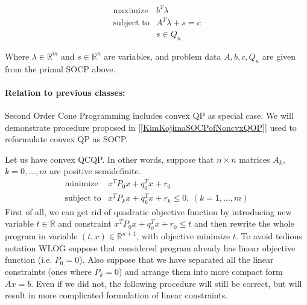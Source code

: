 \documentclass[10pt,oneside]{book}
\theoremstyle{definition}
\begin{document}
\begin{equation}
\label{socd} 
\begin{array}{ll}
\mbox{maximize} & b^T\lambda\\
\mbox{subject to}& A^T\lambda+ s = c\\
& s \in Q_n
\end{array} 
\tag{SOCD}
\end{equation}

Where $\lambda\in \mathbb{R}^m$ and $s\in \mathbb{R}^n$ are variables, and problem data $A,b,c,Q_n$ are given from the  primal SOCP above.

\paragraph{Relation to previous classes:}

Second Order Cone Programming includes convex QP as special case.
We will demonstrate procedure proposed in [\ref{KimKojimaSOCPofNoncvxQOP}] used to reformulate convex QP as SOCP.

Let us have convex QCQP. In other words, suppose that $n\times n$ matrices $A_k$, $k=0,\dots ,m$ are positive semidefinite. 
\begin{equation}
\begin{array}{ll}
\mbox{minimize}& x^TP_0x + q_0^Tx + r_0 \\
\mbox{subject to}& x^TP_kx + q_k^Tx + r_k \leq 0, \  (k = 1,\dots ,m)
\end{array} 
\end{equation}
First of all, we can get rid of quadratic objective function by introducing new variable $t\in \mathbb{R}$ and constraint $x^TP_0x + q_0^Tx +r_0 \leq t$ and then rewrite the whole program in variable $(t,x)\in \mathbb{R}^{n+1}$, with objective minimize $t$. To avoid tedious notation WLOG suppose that considered program already has linear objective function (i.e. $P_0 = 0$).  Also suppose that we have separated all the linear constraints (ones where $P_k = 0$) and arrange them into more compact form $Ax=b$. Even if we did not, the following procedure will still be correct, but will result in more complicated formulation of linear constraints.
\end{document}
